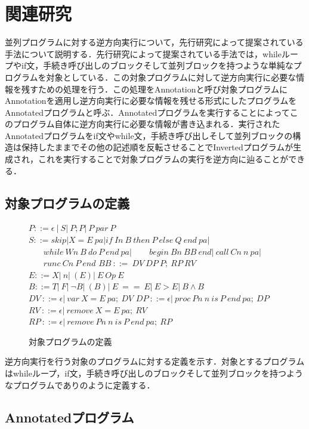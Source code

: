\documentclass[submit,PRO]{ipsj}
\begin{document}
\section{関連研究}

並列プログラムに対する逆方向実行について，先行研究\cite{HIY18,H20}によって提案されている手法について説明する．先行研究\cite{HIY18,H20}によって提案されている手法では，whileループやif文，手続き呼び出しのブロックそして並列ブロックを持つような単純なプログラムを対象としている．この対象プログラムに対して逆方向実行に必要な情報を残すための処理を行う．この処理をAnnotationと呼び対象プログラムにAnnotationを適用し逆方向実行に必要な情報を残せる形式にしたプログラムをAnnotatedプログラムと呼ぶ．Annotatedプログラムを実行することによってこのプログラム自体に逆方向実行に必要な情報が書き込まれる．実行されたAnnotatedプログラムをif文やwhile文，手続き呼び出しそして並列ブロックの構造は保持したままでその他の記述順を反転させることでInvertedプログラムが生成され，これを実行することで対象プログラムの実行を逆方向に辿ることができる．

\subsection{対象プログラムの定義}

\begin{figure}[tb]
\vbox{
\hbox{$P ::= \epsilon\ |\ S |\ P;P |\ P\ par\ P$}
\hbox{$S ::= skip | X = E\ pa | if\ In\ B\ then\ P\ else\ Q\ end\ pa|$}
\hbox{$\ \ \ \ \ \ \ \ while\ Wn\ B\ do\ P\ end\ pa | $}
\hbox{$\ \ \ \ \ \ \ \ begin\ Bn\ BB\ end |\ call\ Cn\ n\ pa|$}
\hbox{$\ \ \ \ \ \ \ \ runc\ Cn\ P\ end$}
\hbox{$BB\ ::=\ DV\ DP\ P;\ RP\ RV$}
\hbox{$E::=X |\ n |\ (E)|\ E\ Op\ E$}
\hbox{$B::=T|\ F|\ \lnot B |\ (B)|\ E\ ==\ E |\ E > E|\ B \land B$}
\hbox{$DV\ ::= \epsilon |\ var\ X=E\ pa;\ DV$}
\hbox{$DP\ ::= \epsilon |\ proc\ Pn\ n\ is\ P\ end\ pa;\ DP$}
\hbox{$RV\ ::=\epsilon |\  remove\ X=E\ pa;\ RV$}
\hbox{$RP\ ::= \epsilon |\ remove\ Pn\ n\ is\ P\ end\ pa;\ RP$}
}
\centerline{}
\caption{対象プログラムの定義}
\label{fig:Hdef}
\end{figure}


逆方向実行を行う対象のプログラムに対する定義を示す．対象とするプログラムはwhileループ，if文，手続き呼び出しのブロックそして並列ブロックを持つようなプログラムでありのように定義する．



\subsection{Annotatedプログラム}
\end{document}
